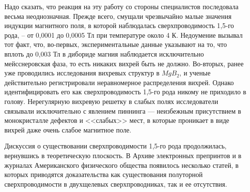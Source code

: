 Надо сказать, что реакция на эту работу со стороны специалистов последовала 
весьма неоднозначная. Прежде всего, смущали чрезвычайно малые значения 
индукции магнитного поля, в которой наблюдалась сверхпроводимость 1,5-го 
рода, -- от 0,0001 до 0,0005 Тл при температуре около 4 К. Недоумение вызывал 
тот факт, что, во-первых, экспериментальные данные указывают на то, что 
вплоть до 0,003 Тл в дибориде магния наблюдается исключительно мейсснеровская 
фаза, то есть никаких вихрей быть не должно. Во-вторых, ранее уже проводились 
исследования вихревых структур в \( MgB_2 \), и ученые действительно 
регистрировали неравномерное распределения вихрей. Однако идентифицировать его 
как сверхпроводимость 1,5-го рода никому не приходило в голову. Нерегулярную 
вихревую решетку в слабых полях исследователи связывали исключительно с 
явлением пиннинга — неизбежным присутствием в монокристалле дефектов и 
<<слабых>> мест, в которые проникает в виде вихрей даже очень слабое 
магнитное поле.

Дискуссия о существовании сверхпроводимости 1,5-го рода продолжилась, 
вернувшись в теоретическую плоскость. В Архиве электронных препринтов и в 
журналах Американского физического общества появилось несколько статей, в 
которых приводятся доказательства как существования полуторной 
сверхпроводимости в двухщелевых сверхпроводниках, так и ее отсутствия. 